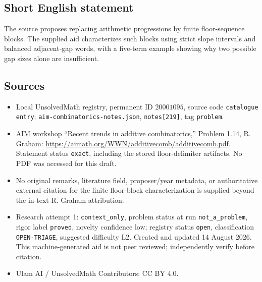 \documentclass[11pt]{article}
\begin{document}
\subsection{Short English statement}
The source proposes replacing arithmetic progressions by finite floor-sequence blocks. The supplied aid characterizes such blocks using strict slope intervals and balanced adjacent-gap words, with a five-term example showing why two possible gap sizes alone are insufficient.
\subsection{Sources}
\begin{itemize}
\item Local UnsolvedMath registry, permanent ID \(20001095\), source code \texttt{catalogue entry}; \texttt{aim-combinatorics-notes.json}, \texttt{notes[219]}, tag \texttt{problem}.
\item AIM workshop ``Recent trends in additive combinatorics,'' Problem 1.14, R. Graham: \url{https://aimath.org/WWN/additivecomb/additivecomb.pdf}. Statement status \texttt{exact}, including the stored floor-delimiter artifacts. No PDF was accessed for this draft.
\item No original remarks, literature field, proposer/year metadata, or authoritative external citation for the finite floor-block characterization is supplied beyond the in-text R. Graham attribution.
\item Research attempt 1: \texttt{context\_only}, problem status at run \texttt{not\_a\_problem}, rigor label \texttt{proved}, novelty confidence low; registry status \texttt{open}, classification \texttt{OPEN-TRIAGE}, suggested difficulty L2. Created and updated 14 August 2026. This machine-generated aid is not peer reviewed; independently verify before citation.
\item Ulam AI / UnsolvedMath Contributors; CC BY 4.0.
\end{itemize}
\end{document}

